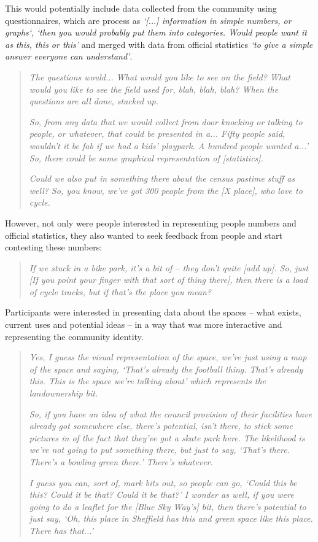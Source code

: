 This would potentially include data collected from the community using questionnaires, which are process as \textit{`[...] information in simple numbers, or graphs`}, \textit{`then you would probably put them into categories. Would people want it as this, this or this'} and merged with data from official statistics \textit{`to give a simple answer everyone can understand'}.
\begin{quote}
    \textit{The questions would... What would you like to see on the field? What would you like to see the field used for, blah, blah, blah? When the questions are all done, stacked up.}
    
   \textit{So, from any data that we would collect from door knocking or talking to people, or whatever, that could be presented in a... Fifty people said, wouldn't it be fab if we had a kids' playpark. A hundred people wanted a...' So, there could be some graphical representation of [statistics].}
    
	\textit{Could we also put in something there about the census pastime stuff as well? So, you know, we've got 300 people from the [X place], who love to cycle.}
\end{quote}
However, not only were people interested in representing people numbers and official statistics, they also wanted to seek feedback from people and start contesting these numbers:
\begin{quote}
    \textit{If we stuck in a bike park, it's a bit of -- they don't quite [add up]. So, just [If you point your finger with that sort of thing there], then there is a load of cycle tracks, but if that's the place you mean?}
\end{quote}

Participants were interested in presenting data about the spaces -- what exists, current uses and potential ideas -- in a way that was more interactive and representing the community identity.
\begin{quote}
    \textit{Yes, I guess the visual representation of the space, we're just using a map of the space and saying, `That's already the football thing. That's already this. This is the space we're talking about' which represents the landownership bit.}
    
    \textit{So, if you have an idea of what the council provision of their facilities have already got somewhere else, there's potential, isn't there, to stick some pictures in of the fact that they've got a skate park here. The likelihood is we're not going to put something there, but just to say, `That's there. There's a bowling green there.' There's whatever.}
    
   \textit{I guess you can, sort of, mark bits out, so people can go, `Could this be this? Could it be that? Could it be that?' I wonder as well, if you were going to do a leaflet for the [Blue Sky Way's] bit, then there's potential to just say, `Oh, this place in Sheffield has this and green space like this place. There has that...'}
\end{quote}

